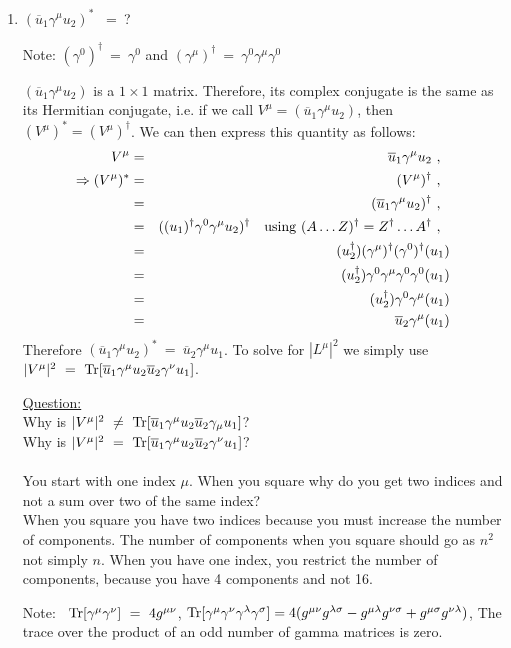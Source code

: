 \documentclass[12pt]{article}
\def \bea{\begin{eqnarray}}
\def \eea{\end{eqnarray}}
\def \Tr{{\rm Tr}}
\def \ou{\overline{u}}
\def \ga{\gamma}
\def \la{\lambda}
\def \si{\sigma}
\begin{document}
\begin{enumerate}

\item$(\ou_1\ga^\mu u_2)^*$ ~=~?

Note: $(\ga^0)^\dag~=~\ga^0$ and $(\ga^\mu)^\dag~=~ \ga^0\ga^\mu\ga^0$

$(\ou_1\ga^\mu u_2)$ is a $1\times1$ matrix. Therefore, its complex conjugate is the same as its Hermitian conjugate, i.e. if we call
$V^\mu = (\ou_1\ga^\mu u_2)$, then $(V^\mu)^* = (V^\mu)^\dag$. We can then express this quantity as follows:
\bea
V^\mu &=& \ou_1\ga^\mu u_2 ~,~~ \\
\Rightarrow (V^\mu)^* &=& (V^\mu)^\dag ~,~~ \\
&=& (\ou_1\ga^\mu u_2)^\dag ~,~~ \\
&=& ((u_1)^\dag\ga^0\ga^\mu u_2)^\dag ~~~{\rm using}~(A\ldots Z)^\dag = Z^\dag\ldots A^\dag ~,~~ \\
&=& (u_2^\dag)(\ga^\mu)^\dag(\ga^0)^\dag(u_1)\\
&=& (u_2^\dag)\ga^0\ga^\mu\ga^0\ga^0(u_1)\\
&=& (u_2^\dag)\ga^0\ga^\mu(u_1)\\
&=& \ou_2\ga^\mu(u_1)
\eea
Therefore $(\ou_1\ga^\mu u_2)^*~=~\ou_2\ga^\mu u_1 $. To solve for $|L^\mu|^2$ we simply use $|V^\mu|^2 ~=~ \Tr[\ou_1 \ga^\mu u_2 \ou_2 \ga^\nu u_1]$.


\underline{Question:} \\
Why is $|V^\mu|^2 ~\ne~ \Tr[\ou_1 \ga^\mu u_2 \ou_2 \ga_\mu u_1]$? \\
Why is $|V^\mu|^2 ~=~ \Tr[\ou_1 \ga^\mu u_2 \ou_2 \ga^\nu u_1]$? \\ \\

You start with one index $\mu$. When you square why do you get two indices and not a sum over two of the same index? \\
When you square you have two indices because you must increase the number of components. The number of components when you square should go as $n^2$ not simply $n$. When you have one index, you restrict the number of components, because you have 4 components and not 16.

\bigskip

Note: ~$\Tr[\ga^\mu\ga^\nu]~=~4 g^{\mu\nu}$, $\Tr[\ga^\mu \ga^\nu \ga^\la \ga^\si]= 4(g^{\mu\nu}g^{\la\si} - g^{\mu\la} g^{\nu\si} + g^{\mu\si}g^{\nu\la})$, The trace over the product of an odd number of gamma matrices is zero.


\end{enumerate}
\end{document}
